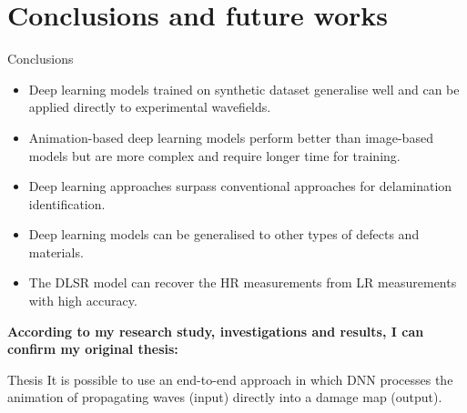 \documentclass[10pt,aspectratio=169,dvipsnames]{beamer} %
\begin{document}
	\section{Conclusions and future works}
	\begin{frame}{Conclusions}		
		\begin{footnotesize}
			\begin{justify}
				\addtolength{\leftmargini}{\labelsep}
				\begin{itemize}
					\item{Deep learning models trained on synthetic dataset generalise well and can be applied directly to experimental wavefields.}				
					\item{Animation-based deep learning models perform better than image-based models but are more complex and require longer time for training.}
					\item{Deep learning approaches surpass conventional approaches for delamination identification.}
					\item{Deep learning models can be generalised to other types of defects and materials.}
					\item{The DLSR model can recover the HR measurements from LR measurements with high accuracy.}
				\end{itemize}
			\end{justify}				
		\begin{tcolorbox}
			\begin{justify}
				\textbf{According to my research study, investigations and results, I can confirm my original thesis:}
				\begin{alertblock}{Thesis}
					It is possible to use an end-to-end approach in which DNN 
					processes the animation of propagating waves (input) directly into a damage map (output).
				\end{alertblock}
			\end{justify}			
		\end{tcolorbox}				
		\end{footnotesize}			
	\end{frame}		
\end{document}
